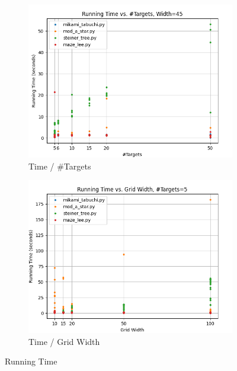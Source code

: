 \begin{figure}
\centering

\begin{subfigure}[b]{\linewidth}
    \includegraphics[width=\linewidth]{figures/plots/areaConst.png}
    \caption{Time / \#Targets}
\end{subfigure}
\begin{subfigure}[b]{\linewidth}
    \includegraphics[width=\linewidth]{figures/plots/nConst.png}
    \caption{Time / Grid Width}
\end{subfigure}

\caption{Running Time}
\label{fig:runningTime}
\end{figure}

